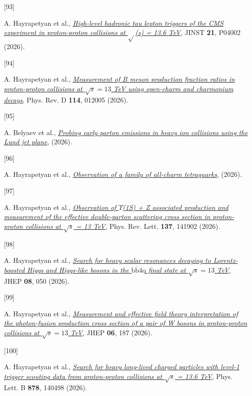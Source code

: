 \documentclass[
]{article}
\newlength{\cslhangindent}
\newlength{\csllabelwidth}
\newenvironment{CSLReferences}[2] %
 {\begin{list}{}{%
  \setlength{\itemindent}{0pt}
  \setlength{\leftmargin}{0pt}
  \setlength{\parsep}{0pt}
  \ifodd #1
   \setlength{\leftmargin}{\cslhangindent}
   \setlength{\itemindent}{-1\cslhangindent}
  \fi
  \setlength{\itemsep}{#2\baselineskip}}}
 {\end{list}}
\newcommand{\CSLLeftMargin}[1]{\parbox[t]{\csllabelwidth}{\strut#1\strut}}
\newcommand{\CSLRightInline}[1]{\parbox[t]{\linewidth - \csllabelwidth}{\strut#1\strut}}
\let\oldUpsilon\Upsilon
\renewcommand{\Upsilon}{\ensuremath{\oldUpsilon}}
\begin{document}
\begin{CSLReferences}{0}{0}
\CSLLeftMargin{{[}93{]} }%
\CSLRightInline{A. Hayrapetyan et al.,
\emph{\href{https://doi.org/10.1088/1748-0221/21/04/P04002}{{High-level
hadronic tau lepton triggers of the CMS experiment in proton-proton
collisions at {\(\sqrt{}\)}(s) = 13.6 TeV}}}, JINST \textbf{21}, P04002
(2026).}

\CSLLeftMargin{{[}94{]} }%
\CSLRightInline{A. Hayrapetyan et al.,
\emph{\href{https://doi.org/10.1103/36cv-vst3}{{Measurement of B meson
production fraction ratios in proton-proton collisions at
\(\sqrt{s}=13\) TeV using open-charm and charmonium decays}}}, Phys.
Rev. D \textbf{114}, 012005 (2026).}

\CSLLeftMargin{{[}95{]} }%
\CSLRightInline{A. Belyaev et al.,
\emph{\href{https://arxiv.org/abs/2602.09271}{{Probing early parton
emissions in heavy ion collisions using the Lund jet plane}}}, (2026).}

\CSLLeftMargin{{[}96{]} }%
\CSLRightInline{A. Hayrapetyan et al.,
\emph{\href{https://arxiv.org/abs/2602.02252}{{Observation of a family
of all-charm tetraquarks}}}, (2026).}

\CSLLeftMargin{{[}97{]} }%
\CSLRightInline{A. Hayrapetyan et al.,
\emph{\href{https://doi.org/10.1103/hgvs-jplv}{{Observation of \(\ensuremath{\Upsilon}\)(1S)
+ Z associated production and measurement of the effective double-parton
scattering cross section in proton-proton collisions at \(\sqrt{s}\) =
13 TeV}}}, Phys. Rev. Lett. \textbf{137}, 141902 (2026).}

\CSLLeftMargin{{[}98{]} }%
\CSLRightInline{A. Hayrapetyan et al.,
\emph{\href{https://doi.org/10.1007/JHEP08(2026)050}{{Search for heavy
scalar resonances decaying to Lorentz-boosted Higgs and Higgs-like
bosons in the \(\mathrm{b}\overline{\mathrm{b}}4\mathrm{q}\) final state
at \(\sqrt{s}=13\) TeV}}}, JHEP \textbf{08}, 050 (2026).}

\CSLLeftMargin{{[}99{]} }%
\CSLRightInline{A. Hayrapetyan et al.,
\emph{\href{https://doi.org/10.1007/JHEP06(2026)187}{{Measurement and
effective field theory interpretation of the photon-fusion production
cross section of a pair of W bosons in proton-proton collisions at
\(\sqrt{s}=13\) TeV}}}, JHEP \textbf{06}, 187 (2026).}

\CSLLeftMargin{{[}100{]} }%
\CSLRightInline{A. Hayrapetyan et al.,
\emph{\href{https://doi.org/10.1016/j.physletb.2026.140498}{{Search for
heavy long-lived charged particles with level-1 trigger scouting data
from proton-proton collisions at \(\sqrt{s}\) = 13.6 TeV}}}, Phys. Lett.
B \textbf{878}, 140498 (2026).}


\end{CSLReferences}
\end{document}
